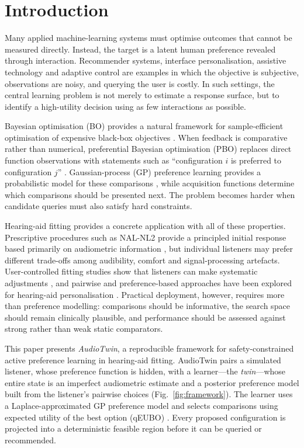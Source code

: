 \documentclass[preprint,12pt]{elsarticle}
\begin{document}
\section{Introduction}
\label{sec:introduction}

Many applied machine-learning systems must optimise outcomes that cannot be measured directly. Instead, the target is a latent human preference revealed through interaction. Recommender systems, interface personalisation, assistive technology and adaptive control are examples in which the objective is subjective, observations are noisy, and querying the user is costly. In such settings, the central learning problem is not merely to estimate a response surface, but to identify a high-utility decision using as few interactions as possible.

Bayesian optimisation (BO) provides a natural framework for sample-efficient optimisation of expensive black-box objectives \cite{shahriari2016}. When feedback is comparative rather than numerical, preferential Bayesian optimisation (PBO) replaces direct function observations with statements such as ``configuration $i$ is preferred to configuration $j$'' \cite{gonzalez2017}. Gaussian-process (GP) preference learning provides a probabilistic model for these comparisons \cite{chu2005,rasmussen2006}, while acquisition functions determine which comparisons should be presented next. The problem becomes harder when candidate queries must also satisfy hard constraints.

Hearing-aid fitting provides a concrete application with all of these properties. Prescriptive procedures such as NAL-NL2 provide a principled initial response based primarily on audiometric information \cite{keidser2011}, but individual listeners may prefer different trade-offs among audibility, comfort and signal-processing artefacts. User-controlled fitting studies show that listeners can make systematic adjustments \cite{dreschler2008,boothroyd2017,mackersie2019,sabin2020}, and pairwise and preference-based approaches have been explored for hearing-aid personalisation \cite{birlutiu2010,nielsen2015,vyas2022,akbarzadeh2022,ni2024}. Practical deployment, however, requires more than preference modelling: comparisons should be informative, the search space should remain clinically plausible, and performance should be assessed against strong rather than weak static comparators.

This paper presents \textit{AudioTwin}, a reproducible framework for safety-constrained active preference learning in hearing-aid fitting. AudioTwin pairs a simulated listener, whose preference function is hidden, with a learner---the \emph{twin}---whose entire state is an imperfect audiometric estimate and a posterior preference model built from the listener's pairwise choices (Fig.~\ref{fig:framework}). The learner uses a Laplace-approximated GP preference model and selects comparisons using expected utility of the best option (qEUBO) \cite{astudillo2023}. Every proposed configuration is projected into a deterministic feasible region before it can be queried or recommended.
\end{document}
